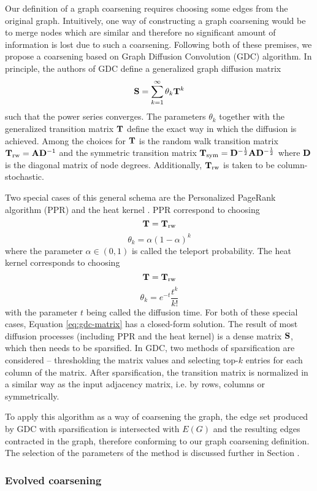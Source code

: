 Our definition of a graph coarsening requires choosing some edges from the original graph. Intuitively, one way of constructing a graph coarsening would be to merge nodes which are similar and therefore no significant amount of information is lost due to such a coarsening. Following both of these premises,  we propose a coarsening based on Graph Diffusion Convolution (GDC) \cite{gasteiger_diffusion_2019} algorithm. In principle, the authors of GDC define a generalized graph diffusion matrix
\begin{equation}\label{eq:gdc-matrix}
  \mathbf{S} = \sum_{k = 1}^\infty \theta_k \mathbf{T}^k
\end{equation}
such that the power series converges. The parameters \( \theta_k \) together with the generalized transition matrix \( \mathbf{T} \) define the exact way in which the diffusion is achieved. Among the choices for \( \mathbf{T} \) is the random walk transition matrix \( \mathbf{T}_ \mathrm{rw} = \mathbf{A} \mathbf{D}^{-1} \) and the symmetric transition matrix \( \mathbf{T}_\mathrm{sym} = \mathbf{D}^{-\frac{1}{2}} \mathbf{A} \mathbf{D}^{-\frac{1}{2}} \) where \( \mathbf{D} \) is the diagonal matrix of node degrees. Additionally, \( \mathbf{T}_\mathrm{rw} \) is taken to be column-stochastic.

Two special cases of this general schema are the Personalized PageRank algorithm (PPR) \cite{page_pagerank_1999} and the heat kernel \cite{kondor_diffusion_2002}. PPR correspond to choosing
\[ \mathbf{T} = \mathbf{T}_\mathrm{rw} \]
\[ \theta_k = \alpha \left( 1 - \alpha \right)^k \]
where the parameter \( \alpha \in \left( 0, 1 \right) \) is called the teleport probability. The heat kernel corresponds to choosing
\[ \mathbf{T} = \mathbf{T}_\mathrm{rw} \]
\[ \theta_k = e^{-t} \frac{t^k}{k!} \]
with the parameter \( t \) being called the diffusion time. For both of these special cases, Equation \ref{eq:gdc-matrix} has a closed-form solution. The result of most diffusion processes (including PPR and the heat kernel) is a dense matrix \( \mathbf{S} \), which then needs to be sparsified. In GDC, two methods of sparsification are considered -- thresholding the matrix values and selecting top-\( k \) entries for each column of the matrix. After sparsification, the transition matrix is normalized in a similar way as the input adjacency matrix, i.e. by rows, columns or symmetrically.

To apply this algorithm as a way of coarsening the graph, the edge set produced by GDC with sparsification is intersected with \( E \left( G \right) \) and the resulting edges contracted in the graph, therefore conforming to our graph coarsening definition. The selection of the parameters of the method is discussed further in Section .

\subsubsection{Evolved coarsening}
